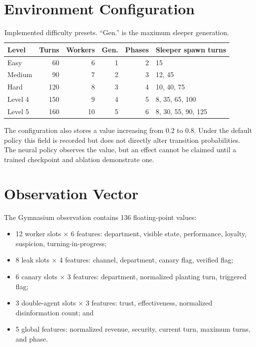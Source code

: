 \section{Environment Configuration}

\begin{table}[h]
\centering
\caption{Implemented difficulty presets. ``Gen.'' is the maximum sleeper generation.}
\begin{tabular}{lrrrrl}
\toprule
Level & Turns & Workers & Gen. & Phases & Sleeper spawn turns \\
\midrule
Easy & 60 & 6 & 1 & 2 & 15 \\
Medium & 90 & 7 & 2 & 3 & 12, 45 \\
Hard & 120 & 8 & 3 & 4 & 10, 40, 75 \\
Level 4 & 150 & 9 & 4 & 5 & 8, 35, 65, 100 \\
Level 5 & 160 & 10 & 5 & 6 & 8, 30, 55, 90, 125 \\
\bottomrule
\end{tabular}
\end{table}

The configuration also stores a  value increasing from 0.2 to 0.8. Under the default  policy this field is recorded but does not directly alter transition probabilities. The neural policy observes the value, but an effect cannot be claimed until a trained checkpoint and ablation demonstrate one.

\section{Observation Vector}

The Gymnasium observation contains 136 floating-point values:
\begin{itemize}[leftmargin=*]
  \item 12 worker slots $\times$ 6 features: department, visible state, performance, loyalty, suspicion, turning-in-progress;
  \item 8 leak slots $\times$ 4 features: channel, department, canary flag, verified flag;
  \item 6 canary slots $\times$ 3 features: department, normalized planting turn, triggered flag;
  \item 3 double-agent slots $\times$ 3 features: trust, effectiveness, normalized disinformation count; and
  \item 5 global features: normalized revenue, security, current turn, maximum turns, and phase.
\end{itemize}

